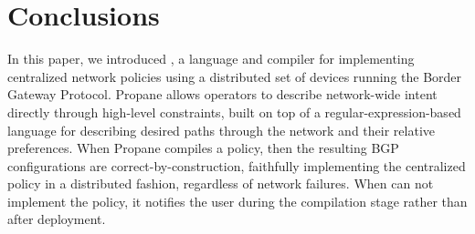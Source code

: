 \section{Conclusions}
\label{sec:conclusions}

In this paper, we introduced \sysname, a language and compiler for implementing centralized network policies using a distributed set of devices running the Border Gateway Protocol. Propane allows operators to describe network-wide intent directly through high-level constraints, built on top of a regular-expression-based language for describing desired paths through the network and their relative preferences. When Propane compiles a policy, then the resulting BGP configurations are correct-by-construction, faithfully implementing the centralized policy in a distributed fashion, regardless of network failures. When \sysname can not implement the policy, it notifies the user during the compilation stage rather than after deployment.